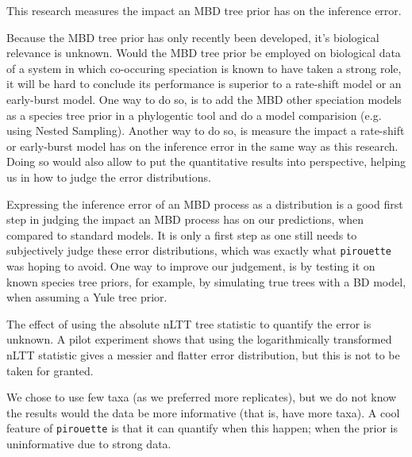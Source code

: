 This research measures the impact an MBD tree prior 
has on the inference error. 

Because the MBD tree prior has only recently been 
developed, it's biological relevance is unknown.
Would the MBD tree prior be employed on biological data of a system
in which co-occuring speciation is known to have taken a strong role,
it will be hard to conclude its performance is superior to a
rate-shift model or an early-burst model. One way to do so, is
to add the MBD other speciation models as a species tree prior
in a phylogentic tool and do a model comparision (e.g. using Nested Sampling).
Another way to do so, is measure the impact a rate-shift or early-burst model
has on the inference error in the same way as this research.
Doing so would also allow to put the quantitative results into perspective,
helping us in how to judge the error distributions. 

Expressing the inference error of an MBD process as a distribution
is a good first step in judging the impact an MBD process has on
our predictions, when compared to standard models. It is only a first
step as one still needs to subjectively judge these error distributions,
which was exactly what \verb;pirouette; was hoping to avoid. 
One way to improve our judgement, is by testing it on known species tree
priors, for example, by simulating true trees with a BD model, when assuming
a Yule tree prior.  

The effect of using the absolute nLTT tree statistic to quantify the error
is unknown. A pilot experiment  shows that
using the logarithmically transformed nLTT statistic gives a messier and
flatter error distribution, but this is not to be taken for granted.

We chose to use few taxa (as we preferred more replicates), but we do not
know the results would the data be more informative (that is, have more taxa).
A cool feature of \verb;pirouette; is that it can quantify when this happen;
when the prior is uninformative due to strong data.
\fi